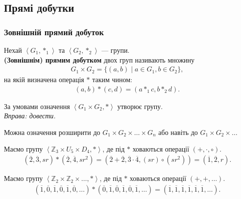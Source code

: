 \documentclass{math_library}
\begin{document}
\subsection{Прямі добутки}
\subsubsection{Зовнішній прямий добуток}
\begin{definition}
Нехай $\left<G_1, *_1 \right>$ та $\left<G_2, *_2 \right>$ --- групи.\\
\textbf{(Зовнішнім) прямим добутком} двох груп називають множину
\begin{align*}
G_1 \times G_2 = \{(a,b) \mid a \in G_1, b \in G_2\},
\end{align*}
на якій визначена операція $*$ таким чином:
\begin{align*}
(a,b) * (c,d) = (a *_1 c, b*_2 d).
\end{align*}
\end{definition}

\begin{proposition}
За умовами означення $\left< G_1 \times G_2, * \right>$ утворює групу.\\
\textit{Вправа: довести.}
\end{proposition}

\begin{remark}
Можна означення розширити до $G_1 \times G_2 \times \dots \times G_n$ або навіть до $G_1 \times G_2 \times \dots$
\end{remark}

\begin{example}
Маємо групу $\left< \mathbb{Z}_3 \times U_5 \times D_4, * \right>$, де під $*$ ховаються операції $(+,\cdot,\circ)$.
\begin{align*}
(\overline{2},\overline{3},sr)*(\overline{2}, \overline{4}, sr^2) = (\overline{2}+\overline{2}, \overline{3} \cdot \overline{4}, (sr) \circ (sr^2)) = (\overline{1},\overline{2}, r).
\end{align*}
\end{example}

\begin{example}
Маємо групу $\left< \mathbb{Z}_2 \times \mathbb{Z}_2 \times \dots, * \right>$, де під $*$ ховаються операції $(+,+,\dots)$.
\begin{align*}
(\overline{1},\overline{0},\overline{1},\overline{0},\overline{1},\overline{0},\dots)*(\overline{0},\overline{1},\overline{0},\overline{1},\overline{0},\overline{1},\dots) = (\overline{1},\overline{1},\overline{1},\overline{1},\overline{1},\overline{1},\dots).
\end{align*}
\end{example}
\end{document}
